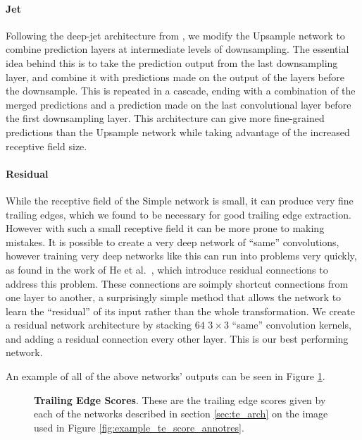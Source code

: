 \paragraph{Jet}
Following the deep-jet architecture from \cite{long2015fully}, we modify the Upsample network to combine prediction layers at intermediate levels of downsampling.
The essential idea behind this is to take the prediction output from the last downsampling layer, and combine it with predictions made on the output of the layers before the downsample.
This is repeated in a cascade, ending with a combination of the merged predictions and a prediction made on the last convolutional layer before the first downsampling layer.
This architecture can give more fine-grained predictions than the Upsample network while taking advantage of the increased receptive field size.

\paragraph{Residual}
While the receptive field of the Simple network is small, it can produce very fine trailing edges, which we found to be necessary for good trailing edge extraction.
However with such a small receptive field it can be more prone to making mistakes.
It is possible to create a very deep network of ``same'' convolutions, however training very deep networks like this can run into problems very quickly, as found in the work of He et al.\ \cite{he2015deep}, which introduce residual connections to address this problem.
These connections are soimply shortcut connections from one layer to another, a surprisingly simple method that allows the network to learn the ``residual'' of its input rather than the whole transformation.
We create a residual network architecture by stacking $64$ $3\times3$ ``same'' convolution kernels, and adding a residual connection every other layer.
This is our best performing network.

An example of all of the above networks' outputs can be seen in Figure \ref{fig:example_te_scores_all}.

\begin{figure}[t]%
\centering
{}
\newline
{}
\caption[]{\textbf{Trailing Edge Scores}. These are the trailing edge scores given by each of the networks described in section \ref{sec:te_arch} on the image used in Figure \ref{fig:example_te_score_annotres}.}
\label{fig:example_te_scores_all}
\end{figure}

